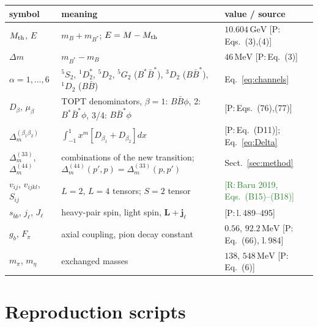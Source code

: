 \documentclass[11pt,a4paper]{article}
\newcommand{\tagP}[1]{\textcolor{blue!65!black}{\textsf{\small[P:\,#1]}}}
\newcommand{\tagR}[1]{\textcolor{ForestGreen}{\textsf{\small[R:\,#1]}}}
\newcommand{\BB}{B\bar B}
\newcommand{\BBst}{B\bar B^*}
\newcommand{\BstBst}{B^*\bar B^*}
\newcommand{\Mth}{M_{\rm th}}
\newcommand{\GeV}{\,\mathrm{GeV}}
\newcommand{\MeV}{\,\mathrm{MeV}}
\newcommand{\D}[2]{\Delta^{(#1)}_{#2}}
\begin{document}
\begin{center}
\small
\begin{tabular}{>{\raggedright\arraybackslash}p{2.6cm}>{\raggedright\arraybackslash}p{8.0cm}>{\raggedright\arraybackslash}p{4.6cm}}
\toprule
symbol & meaning & value / source\\
\midrule
$\Mth$, $E$ & $m_B+m_{B^*}$; $E=M-\Mth$ & $10.604\GeV$ \tagP{Eqs.~(3),(4)}\\
$\Delta m$ & $m_{B^*}-m_B$ & $46\MeV$ \tagP{Eq.~(3)}\\
$\alpha=1,\dots,6$ & $^5S_2$, $^1D_2^*$, $^5D_2$, $^5G_2$ ($\BstBst$), $^3D_2$ ($\BBst$), $^1D_2$ ($\BB$) & Eq.~\eqref{eq:channels}\\
$D_\beta$, $\mu_\beta$ & TOPT denominators, $\beta=1$: $\BB\phi$, 2: $\BstBst\phi$, 3/4: $B\bar B^*\phi$ & \tagP{Eqs.~(76),(77)}\\
$\D{\beta_1\beta_2}{m}$ & $\int_{-1}^1x^m[D_{\beta_1}+D_{\beta_2}]dx$ & \tagP{Eq.~(D11)}; Eq.~\eqref{eq:Delta}\\
$\D{33}{m}$, $\D{44}{m}$ & combinations of the new transition; $\D{44}{m}(p',p)=\D{33}{m}(p,p')$ & Sect.~\ref{sec:method}\\
$v_{ij}$, $v_{ijkl}$, $S_{ij}$ & $L=2$, $L=4$ tensors; $S=2$ tensor & \tagR{Baru 2019, Eqs.~(B15)--(B18)}\\
$s_{\bar bb}$, $j_\ell$, $J_\ell$ & heavy-pair spin, light spin, $\bm L+\bm j_\ell$ & \tagP{l.\,489--495}\\
$g_b$, $F_\pi$ & axial coupling, pion decay constant & $0.56$, $92.2\MeV$ \tagP{Eq.~(66), l.\,984}\\
$m_\pi$, $m_\eta$ & exchanged masses & $138$, $548\MeV$ \tagP{Eq.~(6)}\\
\bottomrule
\end{tabular}
\end{center}

\section{Reproduction scripts}
\end{document}
